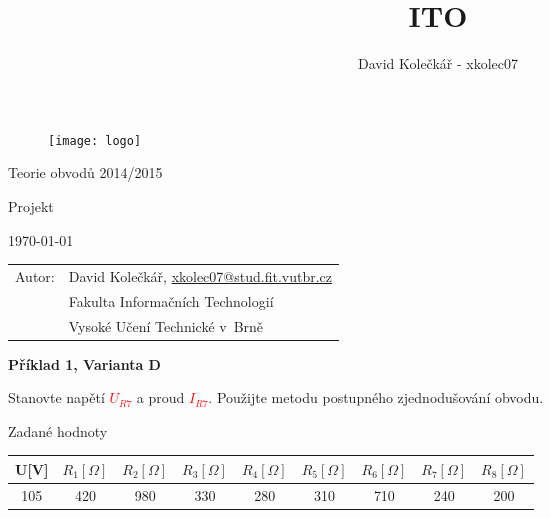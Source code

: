 \documentclass[a4paper,12pt]{article}
\author{David Kolečkář - xkolec07}
\title{ITO}
\begin{document}
\begin{figure}[!h]
  \centering
  \texttt{[image: logo]}
\end{figure}

\begin{center}
\bigskip
\begin{Huge}
Teorie obvodů 2014/2015\\
\end{Huge}
\begin{large}
Projekt
\end{large}
\end{center}

\begin{center}
\begin{Large}
\today
\end{Large}
\end{center}

\vfill

\begin{flushleft}
\begin{large}
\begin{tabular}{ll}
Autor: & David Kolečkář, \url{xkolec07@stud.fit.vutbr.cz} \\
 & Fakulta Informačních Technologií \\
 & Vysoké Učení Technické v~Brně \\
\end{tabular}
\end{large}
\end{flushleft}

\newpage
\begin{center}
\textbf{Příklad 1, Varianta D}
\end{center}
\bigskip
Stanovte napětí
\textcolor{red}{$U_{R7}$}
a proud
\textcolor{red}{$I_{R7}$}.
Použijte metodu postupného zjednodušování obvodu.
\bigskip

Zadané hodnoty

\begin{tabular} {|  c | c | c | c | c | c | c | c | c | }
\hline
U[V] & $R_1[\Omega]$ & $R_2[\Omega]$ & $R_3[\Omega]$ & $R_4[\Omega]$ & $R_5[\Omega]$ & $R_6[\Omega]$ & $R_7[\Omega]$ & $R_8[\Omega]$\\ \hline
105 & 420 & 980 & 330 & 280 & 310 & 710 & 240 & 200 \\ \hline
\end{tabular}
\bigskip
\end{document}
